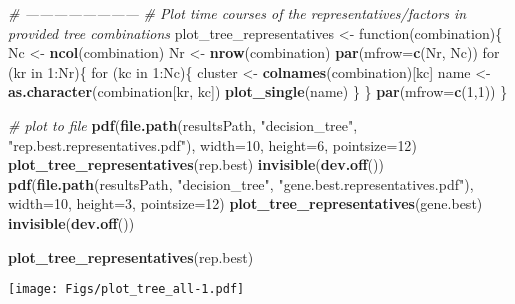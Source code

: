 \documentclass[]{article}
\newenvironment{Shaded}{\begin{snugshade}}{\end{snugshade}}
\newcommand{\KeywordTok}[1]{\textcolor[rgb]{0.13,0.29,0.53}{\textbf{{#1}}}}
\newcommand{\DataTypeTok}[1]{\textcolor[rgb]{0.13,0.29,0.53}{{#1}}}
\newcommand{\DecValTok}[1]{\textcolor[rgb]{0.00,0.00,0.81}{{#1}}}
\newcommand{\StringTok}[1]{\textcolor[rgb]{0.31,0.60,0.02}{{#1}}}
\newcommand{\CommentTok}[1]{\textcolor[rgb]{0.56,0.35,0.01}{\textit{{#1}}}}
\newcommand{\NormalTok}[1]{{#1}}
\begin{document}
\begin{Shaded}
\begin{Highlighting}[]
\CommentTok{# ------------------------}
\CommentTok{# Plot time courses of the representatives/factors in provided tree combinations}
\NormalTok{plot_tree_representatives <-}\StringTok{ }\NormalTok{function(combination)\{}
  \NormalTok{Nc <-}\StringTok{ }\KeywordTok{ncol}\NormalTok{(combination)}
  \NormalTok{Nr <-}\StringTok{ }\KeywordTok{nrow}\NormalTok{(combination)}
  \KeywordTok{par}\NormalTok{(}\DataTypeTok{mfrow=}\KeywordTok{c}\NormalTok{(Nr, Nc))}
  \NormalTok{for (kr in }\DecValTok{1}\NormalTok{:Nr)\{}
    \NormalTok{for (kc in }\DecValTok{1}\NormalTok{:Nc)\{}
      \NormalTok{cluster <-}\StringTok{ }\KeywordTok{colnames}\NormalTok{(combination)[kc]}
      \NormalTok{name <-}\StringTok{ }\KeywordTok{as.character}\NormalTok{(combination[kr, kc])}
      \KeywordTok{plot_single}\NormalTok{(name)}
    \NormalTok{\}  }
  \NormalTok{\}}
  \KeywordTok{par}\NormalTok{(}\DataTypeTok{mfrow=}\KeywordTok{c}\NormalTok{(}\DecValTok{1}\NormalTok{,}\DecValTok{1}\NormalTok{))}
\NormalTok{\}}

\CommentTok{# plot to file}
\KeywordTok{pdf}\NormalTok{(}\KeywordTok{file.path}\NormalTok{(resultsPath, }\StringTok{"decision_tree"}\NormalTok{, }\StringTok{"rep.best.representatives.pdf"}\NormalTok{), }
    \DataTypeTok{width=}\DecValTok{10}\NormalTok{, }\DataTypeTok{height=}\DecValTok{6}\NormalTok{, }\DataTypeTok{pointsize=}\DecValTok{12}\NormalTok{)}
\KeywordTok{plot_tree_representatives}\NormalTok{(rep.best)}
\KeywordTok{invisible}\NormalTok{(}\KeywordTok{dev.off}\NormalTok{())}
\KeywordTok{pdf}\NormalTok{(}\KeywordTok{file.path}\NormalTok{(resultsPath, }\StringTok{"decision_tree"}\NormalTok{, }\StringTok{"gene.best.representatives.pdf"}\NormalTok{), }
    \DataTypeTok{width=}\DecValTok{10}\NormalTok{, }\DataTypeTok{height=}\DecValTok{3}\NormalTok{, }\DataTypeTok{pointsize=}\DecValTok{12}\NormalTok{)}
\KeywordTok{plot_tree_representatives}\NormalTok{(gene.best)}
\KeywordTok{invisible}\NormalTok{(}\KeywordTok{dev.off}\NormalTok{())}
\end{Highlighting}
\end{Shaded}

\begin{Shaded}
\begin{Highlighting}[]
\KeywordTok{plot_tree_representatives}\NormalTok{(rep.best)}
\end{Highlighting}
\end{Shaded}

\texttt{[image: Figs/plot\_tree\_all-1.pdf]}
\end{document}
